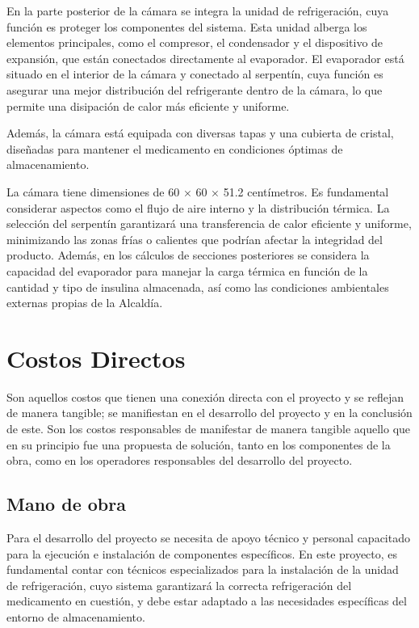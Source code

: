 En la parte posterior de la cámara se integra la unidad de refrigeración, cuya función es proteger los componentes del sistema. Esta unidad alberga los elementos principales, como el compresor, el condensador y el dispositivo de expansión, que están conectados directamente al evaporador. El evaporador está situado en el interior de la cámara y conectado al serpentín, cuya función es asegurar una mejor distribución del refrigerante dentro de la cámara, lo que permite una disipación de calor más eficiente y uniforme.

Además, la cámara está equipada con diversas tapas y una cubierta de cristal, diseñadas para mantener el medicamento en condiciones óptimas de almacenamiento.

La cámara tiene dimensiones de 60 × 60 × 51.2 centímetros. Es fundamental considerar aspectos como el flujo de aire interno y la distribución térmica. La selección del serpentín garantizará una transferencia de calor eficiente y uniforme, minimizando las zonas frías o calientes que podrían afectar la integridad del producto. Además, en los cálculos de secciones posteriores se considera la capacidad del evaporador para manejar la carga térmica en función de la cantidad y tipo de insulina almacenada, así como las condiciones ambientales externas propias de la Alcaldía.

 \section{Costos Directos}
 Son aquellos costos que tienen una conexión directa con el proyecto y se reflejan de manera tangible; se manifiestan en el desarrollo del proyecto y en la conclusión de este. Son los costos responsables de manifestar de manera tangible aquello que en su principio fue una propuesta de solución, tanto en los componentes de la obra, como en los operadores responsables del desarrollo del proyecto.
 
 \subsection{Mano de obra}
 Para el desarrollo del proyecto se necesita de apoyo técnico y personal capacitado para la ejecución e instalación de componentes específicos. En este proyecto, es fundamental contar con técnicos especializados para la instalación de la unidad de refrigeración, cuyo sistema garantizará la correcta refrigeración del medicamento en cuestión, y debe estar adaptado a las necesidades específicas del entorno de almacenamiento.
 
